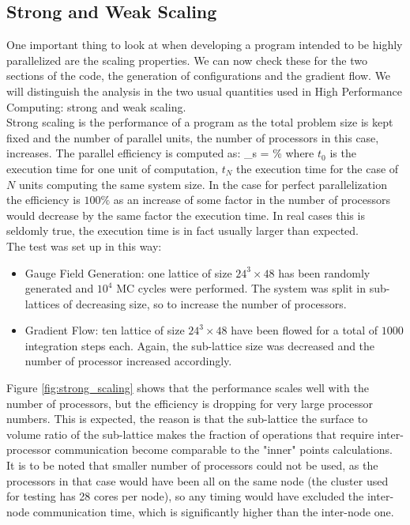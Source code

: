\subsection{Strong and Weak Scaling}
One important thing to look at when developing a program intended to be highly parallelized are the scaling properties. We can now check these for the two sections of the code, the generation of configurations and the gradient flow. We will distinguish the analysis in the two usual quantities used in High Performance Computing: strong and weak scaling. \\
Strong scaling is the performance of a program as the total problem size is kept fixed and the number of parallel units, the number of processors in this case, increases. The parallel efficiency is computed as:
\beq
    \eta_s = \% 
\eeq 
where $t_0$ is the execution time for one unit of computation, $t_N$ the execution time for the case of $N$ units computing the same system size. In the case for perfect parallelization the efficiency is $100\%$ as an increase of some factor in the number of processors would decrease by the same factor the execution time. In real cases this is seldomly true, the execution time is in fact usually larger than expected. \\
The test was set up in this way:
\begin{itemize}
    \item Gauge Field Generation: one lattice of size $24^3\times 48$ has been randomly generated and $10^4$ MC cycles were performed. The system was split in sub-lattices of decreasing size, so to increase the number of processors.
    \item Gradient Flow: ten lattice of size $24^3\times 48$ have been flowed for a total of $1000$ integration steps each. Again, the sub-lattice size was decreased and the number of processor increased accordingly. 
\end{itemize}


Figure \ref{fig:strong_scaling} shows that the performance scales well with the number of processors, but the efficiency is dropping for very large processor numbers. This is expected, the reason is that the sub-lattice the surface to volume ratio of the sub-lattice makes the fraction of operations that require inter-processor communication become comparable to the "inner" points calculations. It is to be noted that smaller number of processors could not be used, as the processors in that case would have been all on the same node (the cluster used for testing has 28 cores per node), so any timing would have excluded the inter-node communication time, which is significantly higher than the inter-node one.

